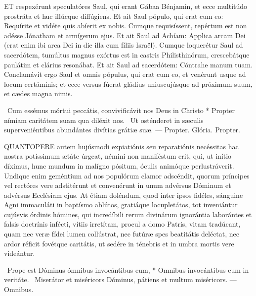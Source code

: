 
\lettrine[lines=2]{E}{T} respexérunt speculatóres Saul, qui erant Gábaa Bénjamin, et ecce multitúdo prostráta et huc illúcque diffúgiens. Et ait Saul pópulo, qui erat cum eo: Requírite et vidéte quis abíerit ex nobis. Cumque requisíssent, repértum est non adésse Jónatham et armígerum ejus. Et ait Saul ad Achíam: Applica arcam Dei (erat enim ibi arca Dei in die illa cum fíliis Israël). Cumque loquerétur Saul ad sacerdótem, tumúltus magnus exórtus est in castris Philisthinórum, crescebátque paulátim et clárius resonábat. Et ait Saul ad sacerdótem: Cóntrahe manum tuam. Conclamávit ergo Saul et omnis pópulus, qui erat cum eo, et venérunt usque ad locum certáminis; et ecce versus fúerat gládius uniuscujúsque ad próximum suum, et cædes magna nimis.

\R\ Cum essémus mórtui peccátis, convivificávit nos Deus in Christo * Propter nímiam caritátem suam qua diléxit nos. \V\ Ut osténderet in sæculis superveniéntibus abundántes divítias grátiæ suæ. --- Propter. Glória. Propter.




\lettrine[lines=2]{Q}{UANTOPERE} autem hujúsmodi expiatiónis seu reparatiónis necéssitas hac nostra potíssimum ætáte úrgeat, némini non maniféstum erit, qui, ut inítio díximus, hunc mundum in malígno pósitum, óculis animóque perlustráverit. Undique enim geméntium ad nos populórum clamor adscéndit, quorum príncipes vel rectóres vere adstitérunt et convenérunt in unum advérsus Dóminum et advérsus Ecclésiam ejus. At étiam doléndum, quod inter ipsos fidéles, sánguine Agni immaculáti in baptísmo ablútos, gratiáque locupletátos, tot inveniántur cujúsvis órdinis hómines, qui incredíbili rerum divinárum ignorántia laborántes et falsis doctrínis infécti, vítiis irretítam, procul a domo Patris, vitam tradúcant, quam nec veræ fídei lumen collústrat, nec futúræ spes beatitátis deléctat, nec ardor réficit fovétque caritátis, ut sedére in ténebris et in umbra mortis vere videántur.

\R\ Prope est Dóminus ómnibus invocántibus eum, * Omnibus invocántibus eum in veritáte. \V\ Miserátor et miséricors Dóminus, pátiens et multum miséricors. --- Omnibus.


